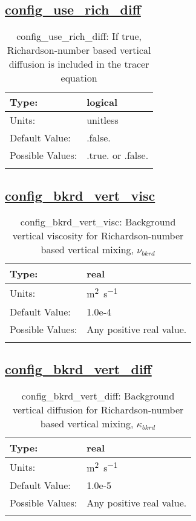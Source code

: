 \subsection[config\_use\_rich\_diff]{\hyperref[sec:nm_tab_vmix_rich]{config\_use\_rich\_diff}}
\label{subsec:nm_sec_config_use_rich_diff}
\begin{center}
\begin{longtable}{| p{2.0in} || p{4.0in} |}
    \hline
    Type: & logical \\
    \hline
    Units: & \si{unitless} \\
    \hline
    Default Value: & .false. \\
    \hline
    Possible Values: & .true. or .false. \\
    \hline
    \caption{config\_use\_rich\_diff: If true, Richardson-number based vertical diffusion is included in the tracer equation}
\end{longtable}
\end{center}
\subsection[config\_bkrd\_vert\_visc]{\hyperref[sec:nm_tab_vmix_rich]{config\_bkrd\_vert\_visc}}
\label{subsec:nm_sec_config_bkrd_vert_visc}
\begin{center}
\begin{longtable}{| p{2.0in} || p{4.0in} |}
    \hline
    Type: & real \\
    \hline
    Units: & \si{m^2.s^{-1}} \\
    \hline
    Default Value: & 1.0e-4 \\
    \hline
    Possible Values: & Any positive real value. \\
    \hline
    \caption{config\_bkrd\_vert\_visc: Background vertical viscosity for Richardson-number based vertical mixing, $\nu_{bkrd}$}
\end{longtable}
\end{center}
\subsection[config\_bkrd\_vert\_diff]{\hyperref[sec:nm_tab_vmix_rich]{config\_bkrd\_vert\_diff}}
\label{subsec:nm_sec_config_bkrd_vert_diff}
\begin{center}
\begin{longtable}{| p{2.0in} || p{4.0in} |}
    \hline
    Type: & real \\
    \hline
    Units: & \si{m^2.s^{-1}} \\
    \hline
    Default Value: & 1.0e-5 \\
    \hline
    Possible Values: & Any positive real value. \\
    \hline
    \caption{config\_bkrd\_vert\_diff: Background vertical diffusion for Richardson-number based vertical mixing, $\kappa_{bkrd}$}
\end{longtable}
\end{center}
